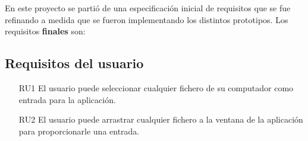 \documentclass[a4paper,11pt]{book}
\begin{document}











En este proyecto se partió de una especificación inicial de requisitos que se fue refinando a medida que se fueron implementando los distintos prototipos. Los requisitos \textbf{finales} son:
\subsection{Requisitos del usuario}
\begin{itemize}
	\item [RU1] El usuario puede seleccionar cualquier fichero de su computador como entrada para la aplicación.
	\item [RU2] El usuario puede arrastrar cualquier fichero a la ventana de la aplicación para proporcionarle una entrada.
\end{itemize}
\end{document}
